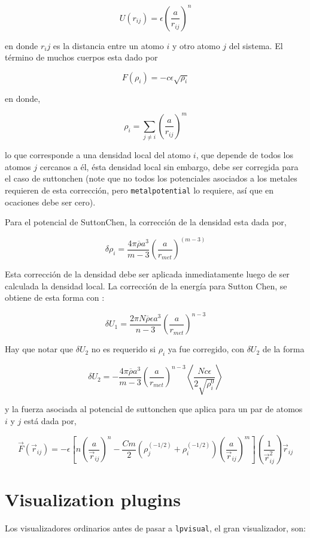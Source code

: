 $$U(r_{ij}) = \epsilon\left(\frac{a}{r_{ij}}\right)^n$$

en donde $r_ij$ es la distancia entre un atomo $i$ y otro atomo $j$ del sistema.
El t\'ermino de muchos cuerpos esta dado por

$$F(\rho_{i}) = -c\epsilon\sqrt{\rho_i}$$

en donde,

$$\rho_i = \sum_{j\neq i} \left(\frac{a}{r_{ij}}\right)^m$$

lo que corresponde a una densidad local del atomo $i$, que depende de todos los
atomos $j$ cercanos a \'el, \'esta densidad local sin embargo, debe ser
corregida para el caso de suttonchen (note que no todos los potenciales
asociados a los metales requieren de esta correcci\'on, pero
\verb|metalpotential| lo requiere, as\'i que en ocaciones debe ser cero).

Para el potencial de SuttonChen, la correcci\'on de la densidad esta dada por,

$$\delta\rho_i=\frac{4\pi\overline{\rho}a^3}{m-3}\left(\frac{a}{r_{met}}\right)^
{(m-3)}$$

Esta correcci\'on de la densidad debe ser aplicada inmediatamente luego de ser
calculada la densidad local. La correcci\'on de la energ\'ia para Sutton Chen,
se obtiene de esta forma con :

$$\delta U_1 = \frac{2\pi N\overline{\rho}\epsilon
a^3}{n-3}\left(\frac{a}{r_{met}}\right)^{n-3}$$

Hay que notar que $\delta U_2$ no es requerido si $\rho_i$ ya fue corregido, con
$\delta U_2$ de la forma

$$\delta U_2 =
-\frac{4\pi\overline{\rho}a^3}{m-3}\left(\frac{a}{r_{met}}\right)^{n-3}
\left<\frac{Nc\epsilon}{2\sqrt{\rho_i^0}}\right>$$

y la fuerza asociada al potencial de suttonchen que aplica para un par de atomos
$i$ y $j$ est\'a dada por,

$$\vec{F}(\vec{r}_{ij}) = -\epsilon\left[n\left(\frac{a}{\vec{r}_{ij}}\right)^n
-
\frac{Cm}{2}(\rho_j^{(-1/2)}+\rho_i^{(-1/2)})\left(\frac{a}{\vec{r}_{ij}}
\right)^m\right]\left(\frac{1}{\vec{r}_{ij}^2}\right)\vec{r}_{ij}$$



\section{Visualization plugins}
Los visualizadores ordinarios antes de pasar a \verb|lpvisual|, el gran
visualizador, son:

